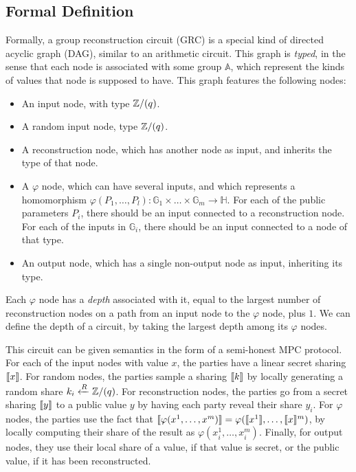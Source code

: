 \subsection{Formal Definition}

Formally, a group reconstruction circuit (GRC) is a special kind of
directed acyclic graph (DAG), similar to an arithmetic circuit.
This graph is \emph{typed}, in the sense that each node is associated
with some group $\mathbb{A}$, which represent the kinds of values
that node is supposed to have.
This graph features the following nodes:

\begin{itemize}
    \item An input node, with type $\mathbb{Z}/(q)$.
    \item A random input node, type $\mathbb{Z}/(q)$.
    \item A reconstruction node, which has another node as input, and inherits the type of that node.
    \item A $\varphi$ node, which can have several inputs, and which represents
    a homomorphism
    $\varphi(P_1, \ldots, P_l) : \mathbb{G}_1 \times \ldots \times \mathbb{G}_m \to \mathbb{H}$.
    For each of the public parameters $P_i$, there should be an input connected to a reconstruction node.
    For each of the inputs in $\mathbb{G}_i$, there should be an input connected to a node of that type.
    \item An output node, which has a single non-output node as input, inheriting its type.
\end{itemize}

Each $\varphi$ node has a \emph{depth} associated with it, equal
to the largest number of reconstruction nodes on a path from an input
node to the $\varphi$ node, plus $1$.
We can define the depth of a circuit, by taking the largest depth
among its $\varphi$ nodes.

This circuit can be given semantics in the form of a semi-honest MPC protocol.
For each of the input nodes with value $x$, the parties have a linear
secret sharing $\llbracket x\rrbracket$. For random nodes, the parties sample
a sharing $\llbracket k\rrbracket$ by locally generating a random share $k_i \xleftarrow{R} \mathbb{Z}/(q)$.
For reconstruction nodes, the parties go from a secret sharing $\llbracket y\rrbracket$
to a public value $y$ by having each party reveal their share $y_i$.
For $\varphi$ nodes, the parties use the fact that
$\llbracket\varphi(x^1, \ldots, x^m)\rrbracket = \varphi(\llbracket x^1\rrbracket, \ldots, \llbracket x\rrbracket^m)$,
by locally computing their share of the result as $\varphi(x^1_i, \ldots, x^m_i)$.
Finally, for output nodes, they use their local share of a value, if that
value is secret, or the public value, if it has been reconstructed.

